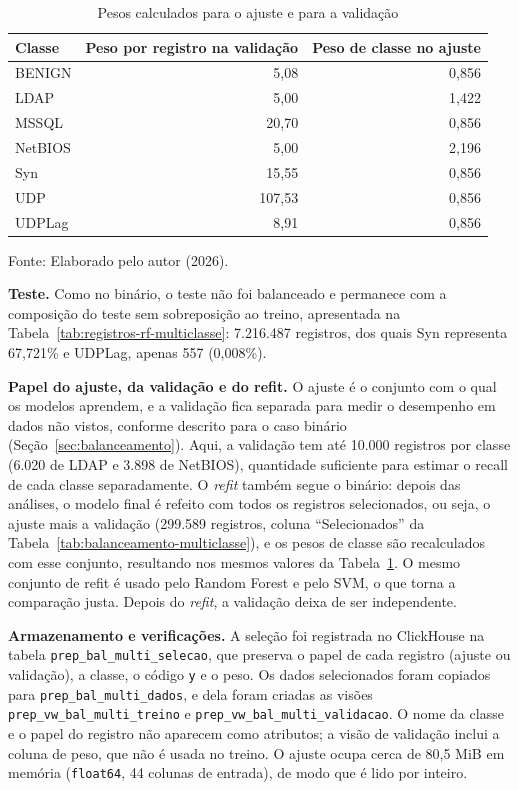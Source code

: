 \documentclass[
    12pt,                %
    openright,           %
    oneside,             %
    a4paper,             %
    english,             %
    brazil               %
]{abntex2}
\begin{document}
\begin{table}
\centering
\caption{Pesos calculados para o ajuste e para a validação}
\label{tab:pesos-multiclasse}
\begin{tabular}{lrr}
\hline
Classe & Peso por registro na validação & Peso de classe no ajuste \\
\hline
BENIGN & 5,08 & 0,856 \\
LDAP & 5,00 & 1,422 \\
MSSQL & 20,70 & 0,856 \\
NetBIOS & 5,00 & 2,196 \\
Syn & 15,55 & 0,856 \\
UDP & 107,53 & 0,856 \\
UDPLag & 8,91 & 0,856 \\
\hline
\end{tabular}
\par\smallskip
Fonte: Elaborado pelo autor (2026).
\end{table}
 
\textbf{Teste.} Como no binário, o teste não foi balanceado e permanece com a composição do teste sem sobreposição ao treino, apresentada na Tabela~\ref{tab:registros-rf-multiclasse}: 7.216.487 registros, dos quais Syn representa 67,721\% e UDPLag, apenas 557 (0,008\%).
 
\textbf{Papel do ajuste, da validação e do refit.} O ajuste é o conjunto com o qual os modelos aprendem, e a validação fica separada para medir o desempenho em dados não vistos, conforme descrito para o caso binário (Seção~\ref{sec:balanceamento}). Aqui, a validação tem até 10.000 registros por classe (6.020 de LDAP e 3.898 de NetBIOS), quantidade suficiente para estimar o recall de cada classe separadamente. O \textit{refit} também segue o binário: depois das análises, o modelo final é refeito com todos os registros selecionados, ou seja, o ajuste mais a validação (299.589 registros, coluna ``Selecionados'' da Tabela~\ref{tab:balanceamento-multiclasse}), e os pesos de classe são recalculados com esse conjunto, resultando nos mesmos valores da Tabela~\ref{tab:pesos-multiclasse}. O mesmo conjunto de refit é usado pelo Random Forest e pelo SVM, o que torna a comparação justa. Depois do \textit{refit}, a validação deixa de ser independente.
 
\textbf{Armazenamento e verificações.} A seleção foi registrada no ClickHouse na tabela \texttt{prep\_bal\_multi\_selecao}, que preserva o papel de cada registro (ajuste ou validação), a classe, o código \texttt{y} e o peso. Os dados selecionados foram copiados para \texttt{prep\_bal\_multi\_dados}, e dela foram criadas as visões \texttt{prep\_vw\_bal\_multi\_treino} e \texttt{prep\_vw\_bal\_multi\_validacao}. O nome da classe e o papel do registro não aparecem como atributos; a visão de validação inclui a coluna de peso, que não é usada no treino. O ajuste ocupa cerca de 80,5 MiB em memória (\texttt{float64}, 44 colunas de entrada), de modo que é lido por inteiro.
 
\end{document}
